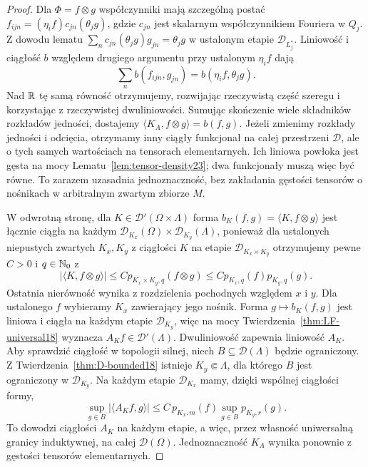 \begin{proof}
Dla $\Phi=f\otimes g$ współczynniki mają szczególną
postać $f_{ijn}=(\eta_i f)c_{jn}(\theta_j g)$,
gdzie $c_{jn}$ jest skalarnym współczynnikiem Fouriera
w $Q_j$. Z dowodu lematu
$\sum_n c_{jn}(\theta_j g)g_{jn}=\theta_j g$
w ustalonym etapie $\mathcal D_{L_j^*}$.
Liniowość i ciągłość $b$ względem drugiego argumentu
przy ustalonym $\eta_i f$ dają
\[
 \sum_n b(f_{ijn},g_{jn})=b(\eta_i f,\theta_j g).
\]
Nad $\mathbb R$ tę samą równość otrzymujemy, rozwijając
rzeczywistą część szeregu i korzystając z rzeczywistej
dwuliniowości. Sumując skończenie wiele składników
rozkładów jedności, dostajemy
$\langle K_A,f\otimes g\rangle=b(f,g)$.
Jeżeli zmienimy rozkłady jedności i odcięcia, otrzymamy
inny ciągły funkcjonał na całej przestrzeni $\mathcal D$,
ale o tych samych wartościach na tensorach elementarnych.
Ich liniowa powłoka jest gęsta na mocy
Lematu~\ref{lem:tensor-density23}; dwa funkcjonały muszą
więc być równe. To zarazem uzasadnia jednoznaczność,
bez zakładania gęstości tensorów o nośnikach w arbitralnym
zwartym zbiorze $M$.

W odwrotną stronę, dla $K\in\mathcal D'(\Omega\times\Lambda)$
forma $b_K(f,g)=\langle K,f\otimes g\rangle$ jest
łącznie ciągła na każdym
$\mathcal D_{K_x}(\Omega)\times\mathcal D_{K_y}(\Lambda)$,
ponieważ dla ustalonych niepustych zwartych $K_x,K_y$
z ciągłości $K$ na etapie $\mathcal D_{K_x\times K_y}$
otrzymujemy pewne $C>0$ i $q\in\mathbb N_0$ z
\[
 |\langle K,f\otimes g\rangle|
 \le C p_{K_x\times K_y,q}(f\otimes g)
 \le C p_{K_x,q}(f)p_{K_y,q}(g).
\]
Ostatnia nierówność wynika z rozdzielenia pochodnych
względem $x$ i $y$. Dla ustalonego $f$ wybieramy
$K_x$ zawierający jego nośnik. Forma $g\mapsto b_K(f,g)$
jest liniowa i ciągła na każdym etapie $\mathcal D_{K_y}$,
więc na mocy Twierdzenia~\ref{thm:LF-universal18}
wyznacza $A_Kf\in\mathcal D'(\Lambda)$. Dwuliniowość
zapewnia liniowość $A_K$.
Aby sprawdzić ciągłość w topologii silnej, niech
$B\subseteq\mathcal D(\Lambda)$ będzie ograniczony.
Z Twierdzenia~\ref{thm:D-bounded18} istnieje
$K_y\Subset\Lambda$, dla którego $B$ jest ograniczony
w $\mathcal D_{K_y}$. Na każdym etapie $\mathcal D_{K_x}$
mamy, dzięki wspólnej ciągłości formy,
\[
 \sup_{g\in B}|\langle A_Kf,g\rangle|
 \le C\,p_{K_x,m}(f)\sup_{g\in B}p_{K_y,r}(g).
\]
To dowodzi ciągłości $A_K$ na każdym etapie, a więc,
przez własność uniwersalną granicy induktywnej,
na całej $\mathcal D(\Omega)$. Jednoznaczność $K_A$
wynika ponownie z gęstości tensorów elementarnych.
\end{proof}

